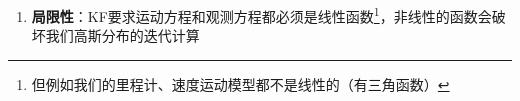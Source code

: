 \documentclass[../main.tex]{subfiles}
\begin{document}
\begin{enumerate}
{{\begin{enumerate}
  $$p(\mathbf{x}_{t-1}\mid \mathbf{Z}^{t-1},\mathbf{U}^{t-2})\sim\mathcal{N}\big(\mathbf{x}_{t-1};\ \boldsymbol{\mu}_{t-1},\ \boldsymbol{\Sigma}_{t-1}\big)$$
  
  $$\bar{p}(\mathbf{x}_t\mid \mathbf{Z}^{t-1},\mathbf{U}^{t-1})=\mathcal{N}\big(\mathbf{x}_t;\ \bar{\boldsymbol{\mu}}_t,\ \bar{\boldsymbol{\Sigma}}_t\big)$$
  
  其中
  \begin{flushleft}
  $ \bar{\boldsymbol{\mu}}_t = \mathbf{A}_t\boldsymbol{\mu}_{t-1} + \mathbf{B}_t\mathbf{u}_{t-1}$\footnote{对前一时刻的均值做线性变换，不断加新的控制量}\\
  $ \bar{\boldsymbol{\Sigma}}_t = \mathbf{A}_t\boldsymbol{\Sigma}_{t-1}\mathbf{A}_t^\top + \mathbf{R}_t$\footnote{从公式可以看到很符合直觉的结论：对前一时刻的协方差做线性变换再加新的误差，所以里程估计不确定性越来越大}
  \end{flushleft}

  \item 观测更新（Measurement update / Correction）
  
  $$p(\mathbf{x}_t\mid \mathbf{Z}^t,\mathbf{U}^{t-1})=\eta\;p(\mathbf{z}_t\mid \mathbf{x}_t)\;\bar{p}(\mathbf{x}_t\mid \mathbf{Z}^{t-1},\mathbf{U}^{t-1})$$
  
  $$p(\mathbf{x}_t\mid \mathbf{Z}^t,\mathbf{U}^{t-1})=\mathcal{N}\big(\mathbf{x}_t;\ \boldsymbol{\mu}_t,\ \boldsymbol{\Sigma}_t\big)$$
  
  其中
  \begin{flushleft}
  $ \boldsymbol{\mu}_t = \bar{\boldsymbol{\mu}}_t + \mathbf{K}_t\big(\mathbf{z}_t - \mathbf{C}_t\bar{\boldsymbol{\mu}}_t\big)$\\
  $ \boldsymbol{\Sigma}_t = \big[\mathbf{I} - \mathbf{K}_t\mathbf{C}_t\big]\ \bar{\boldsymbol{\Sigma}}_t$
  \end{flushleft}
    其中
  $$\mathbf{K}_t = \bar{\boldsymbol{\Sigma}}_t\mathbf{C}_t^\top\big(\mathbf{C}_t\bar{\boldsymbol{\Sigma}}_t\mathbf{C}_t^\top + \mathbf{Q}_t\big)^{-1}$$
    称为新信息矩阵\footnote{可以看到$\mathbf{K}_t$如果乘上$\mathbf{C}_t$后，如果$\mathbf{Q}_t$比较小，那么$\mathbf{K}_t\mathbf{C}_t$就趋近于单位阵$\mathbf{I}$，那么$\mathbf{I}-\mathbf{K}_t\mathbf{C}_t$就变小了，显然$\mathbf{\Sigma}_t$就变小了}
\end{enumerate}
}}
    \item \textbf{局限性}：KF要求运动方程和观测方程都必须是线性函数\footnote{但例如我们的里程计、速度运动模型都不是线性的（有三角函数）}，非线性的函数会破坏我们高斯分布的迭代计算

        
\end{enumerate}
\end{document}
